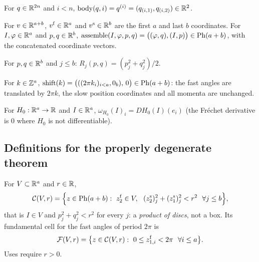 \begin{definition}\label{bpP:p0:body}
For $q\in\mathbb{R}^{2n}$ and $i<n$, $\operatorname{body}(q,i)=q^{(i)}=(q_{(i,1)},q_{(i,2)})\in\mathbb{R}^2$.
\end{definition}

\begin{definition}\label{bpP:p0:blocks}
For $v\in\mathbb{R}^{a+b}$, $v^{\rm f}\in\mathbb{R}^a$ and $v^{\rm s}\in\mathbb{R}^b$ are the first $a$ and last $b$ coordinates. For
$I,\varphi\in\mathbb{R}^a$ and $p,q\in\mathbb{R}^b$,
$\operatorname{assemble}(I,\varphi,p,q)=\bigl((\varphi,q),(I,p)\bigr)\in\mathrm{Ph}(a+b)$, with the concatenated coordinate vectors.
\end{definition}

\begin{definition}\label{bpP:p0:oscaction}
For $p,q\in\mathbb{R}^b$ and $j\le b$: $R_j(p,q)=(p_j^2+q_j^2)/2$.
\end{definition}

\begin{definition}\label{bpP:p0:fastshift}
For $k\in\mathbb{Z}^a$, $\operatorname{shift}(k)=\bigl(((2\pi k_i)_{i<a},0_b),\,0\bigr)\in\mathrm{Ph}(a+b)$: the fast angles are
translated by $2\pi k$, the slow position coordinates and all momenta are unchanged.
\end{definition}

\begin{definition}\label{bpP:p0:fastfreq}
For $H_0:\mathbb{R}^a\to\mathbb{R}$ and $I\in\mathbb{R}^a$, $\omega_{H_0}(I)_i=DH_0(I)(e_i)$ (the Fr\'echet derivative is $0$ where $H_0$ is not
differentiable).
\end{definition}

\subsection{Definitions for the properly degenerate theorem}\label{bpP:p0:pgdefs}

\begin{definition}\label{bpP:p0:cylinder}
For $V\subset\mathbb{R}^a$ and $r\in\mathbb{R}$,
\[\mathcal C(V,r)=\Bigl\{z\in\mathrm{Ph}(a+b):\ z_2^{\rm f}\in V,\ \ (z_2^{\rm s})_j^2+(z_1^{\rm s})_j^2<r^2\ \ \forall j\le b\Bigr\},\]
that is $I\in V$ and $p_j^2+q_j^2<r^2$ for every $j$: a \emph{product of discs}, not a box. Its fundamental cell for the
fast angles of period $2\pi$ is
\[\mathcal F(V,r)=\bigl\{z\in\mathcal C(V,r):\ 0\le z^{\rm f}_{1,i}<2\pi\ \ \forall i\le a\bigr\}.\]
Uses require $r>0$.
\end{definition}

